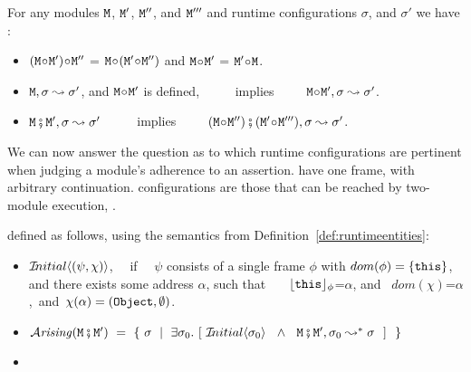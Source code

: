\begin{lemma}
\label{lemma:linking}
 For any modules $\M$,   $\M'$, $\M''$, and $\M'''$ and runtime configurations $\sigma$, and $\sigma'$ we have$:$
 \label{lemma:linking:properties}

 \begin{itemize}
     \item
     $(\M \link \M')\link \M''$ = $\M \link (\M' \link \M'')$  \hspace{1cm} and    \hspace{1cm}   $\M \link \M'$  = $\M' \link\M$.
      \item
      $\M, \sigma \leadsto \sigma'$, and $\M\link \M'$ is defined, \  \ \ \ \  implies\ \ \ \ \   $\M\link \M', \sigma \leadsto \sigma'$.
 \item
 $\M \mkpair \M', \sigma \leadsto \sigma'$   \  \ \ \ \  implies\ \ \ \ \  $(\M\link\M'') \mkpair (\M'\link\M''') ,\sigma \leadsto \sigma'$.  
  \end{itemize}

 \end{lemma}
 
 We can now answer the question as to which runtime configurations are pertinent when judging a module's
adherence to an assertion.
 have one frame, with arbitrary continuation.
 configurations are  those that can be reached by two-module execution, .
 
\begin{definition} defined as follows, using the semantics from Definition~\ref{def:runtimeentities}: \label{def:arise}

\begin{itemize}
     \item
   $\Initial {(\psi,\chi)}$, \ \ if \ \ $\psi$ consists of a single frame $\phi$ with $dom(\phi)=\{ \this \}$, and there exists  some address $\alpha$, such that \ \ \    $\interp {\this}{\phi}$=$\alpha$, and \ $dom(\chi)$=$\alpha$,\  and\  
    $\chi(\alpha)=(\prg{Object},\emptyset)$.
 \item
\sout{ $\Arising  {\M\mkpair\M'} \ = \ \{ \ \sigma \ \mid \ \exists \sigma_0. \ [\  \Initial{\sigma_0} \  \ \wedge\ \  \M\mkpair\M', \sigma_0 \leadsto^* \sigma \ \ ] \ \ \} $}
 \item
 \end{itemize}

\end{definition}
